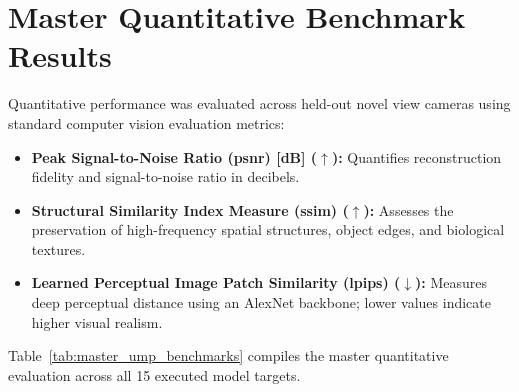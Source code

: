\section{Master Quantitative Benchmark Results}
\label{sec:quantitative_benchmarks}
Quantitative performance was evaluated across held-out novel view cameras using standard computer vision evaluation metrics:
\begin{itemize}
    \item \textbf{Peak Signal-to-Noise Ratio (\gls{psnr}) [dB] ($\uparrow$):} Quantifies reconstruction fidelity and signal-to-noise ratio in decibels.
    \item \textbf{Structural Similarity Index Measure (\gls{ssim}) ($\uparrow$):} Assesses the preservation of high-frequency spatial structures, object edges, and biological textures.
    \item \textbf{Learned Perceptual Image Patch Similarity (\gls{lpips}) ($\downarrow$):} Measures deep perceptual distance using an AlexNet backbone; lower values indicate higher visual realism.
\end{itemize}

Table~\ref{tab:master_ump_benchmarks} compiles the master quantitative evaluation across all 15 executed model targets.


